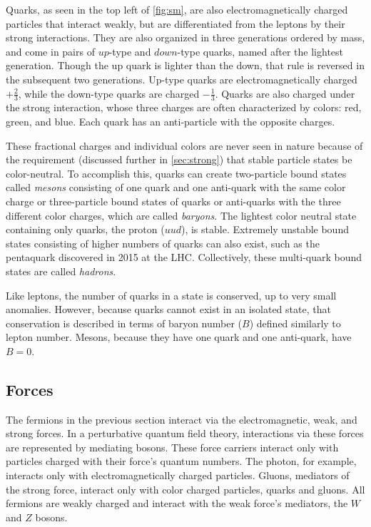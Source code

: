 Quarks, as seen in the top left of \autoref{fig:sm}, are also electromagnetically charged particles that interact weakly, but are differentiated from the leptons by their strong interactions. They are also organized in three generations ordered by mass, and come in pairs of $up$-type and $down$-type quarks, named after the lightest generation. Though the up quark is lighter than the down, that rule is reversed in the subsequent two generations. Up-type quarks are electromagnetically charged $+\frac{2}{3}$, while the down-type quarks are charged $-\frac{1}{3}$. Quarks are also charged under the strong interaction, whose three charges are often characterized by colors: red, green, and blue. Each quark has an anti-particle with the opposite charges. 

These fractional charges and individual colors are never seen in nature because of the requirement (discussed further in \autoref{sec:strong}) that stable particle states be color-neutral. To accomplish this, quarks can create two-particle bound states called \textit{mesons} consisting of one quark and one anti-quark with the same color charge or three-particle bound states of quarks or anti-quarks with the three different color charges, which are called \textit{baryons}. The lightest color neutral state containing only quarks, the proton ($uud$), is stable. Extremely unstable bound states consisting of higher numbers of quarks can also exist, such as the pentaquark discovered in 2015 at the \ac{LHC}. \cite{Pentaquark} Collectively, these multi-quark bound states are called \textit{hadrons}. 

Like leptons, the number of quarks in a state is conserved, up to very small anomalies. However, because quarks cannot exist in an isolated state, that conservation is described in terms of baryon number ($B$) defined similarly to lepton number. Mesons, because they have one quark and one anti-quark, have $B = 0$. 

\subsection{Forces}

The fermions in the previous section interact via the electromagnetic, weak, and strong forces. In a perturbative quantum field theory, interactions via these forces are represented by mediating bosons. These force carriers interact only with particles charged with their  force's quantum numbers. The photon, for example, interacts only with electromagnetically charged particles. Gluons, mediators of the strong force, interact only with color charged particles, quarks and gluons. All fermions are weakly charged and interact with the weak force's mediators, the $W$ and $Z$ bosons. 

